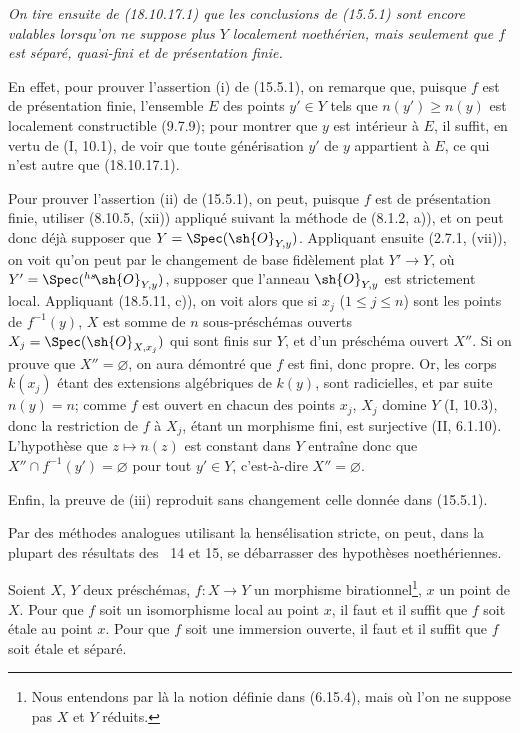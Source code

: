 \emph{On tire ensuite de (18.10.17.1) que les conclusions de (15.5.1) sont encore valables lorsqu'on ne suppose plus $Y$ localement noethérien, mais seulement que $f$ est séparé, quasi-fini et de présentation finie.}

En effet, pour prouver l'assertion (i) de (15.5.1), on remarque que, puisque $f$ est de présentation finie, l'ensemble $E$ des points $y'\in Y$ tels que $n(y')\geq n(y)$ est localement constructible (9.7.9); pour montrer que $y$ est intérieur à $E$, il suffit, en vertu de (I, 10.1), de voir que toute générisation $y'$ de $y$ appartient à $E$, ce qui n'est autre que (18.10.17.1).

Pour prouver l'assertion (ii) de (15.5.1), on peut, puisque $f$ est de présentation finie, utiliser (8.10.5, (xii)) appliqué suivant la méthode de (8.1.2, a)), et on peut donc déjà supposer que $Y=\Spec(\sh{O}_{Y,y})$. Appliquant ensuite (2.7.1, (vii)), on voit qu'on peut par le changement de base fidèlement plat $Y'\to Y$, où $Y'=\Spec({}^{hs}\!\sh{O}_{Y,y})$, supposer que l'anneau $\sh{O}_{Y,y}$ est strictement local. Appliquant (18.5.11, c)), on voit alors que si $x_j$ ($1\leq j\leq n$) sont les points de $f^{-1}(y)$, $X$ est somme de $n$ sous-préschémas ouverts $X_j=\Spec(\sh{O}_{X,x_j})$ qui sont finis sur $Y$, et d'un préschéma ouvert $X''$. Si on prouve que $X''=\varnothing$, on aura démontré que $f$ est fini, donc propre. Or, les corps $k(x_j)$ étant des extensions algébriques de $k(y)$, sont radicielles, et par suite $n(y)=n$; comme $f$ est ouvert en chacun des points $x_j$, $X_j$ domine $Y$ (I, 10.3), donc la restriction de $f$ à $X_j$, étant un morphisme fini, est surjective (II, 6.1.10). L'hypothèse que $z\mapsto n(z)$ est constant dans $Y$ entraîne donc que $X''\cap f^{-1}(y')=\varnothing$ pour tout $y'\in Y$, c'est-à-dire $X''=\varnothing$.

Enfin, la preuve de (iii) reproduit sans changement celle donnée dans (15.5.1).

\begin{env}[18.10.17.2]
\label{IV.18.10.17.2}
Par des méthodes analogues utilisant la hensélisation stricte, on peut, dans la plupart des résultats des \textsection\textsection~14 et 15, se débarrasser des hypothèses noethériennes.
\end{env}

\begin{lemma}[18.10.18]
\label{IV.18.10.18}
Soient $X$, $Y$ deux préschémas, $f:X\to Y$ un morphisme birationnel\footnote{Nous entendons par là la notion définie dans (6.15.4), mais où l'on ne suppose pas $X$ et $Y$ réduits.}, $x$ un point de $X$. Pour que $f$ soit un isomorphisme local au point $x$, il faut et il suffit que $f$ soit étale au point $x$. Pour que $f$ soit une immersion ouverte, il faut et il suffit que $f$ soit étale et séparé.
\end{lemma}

